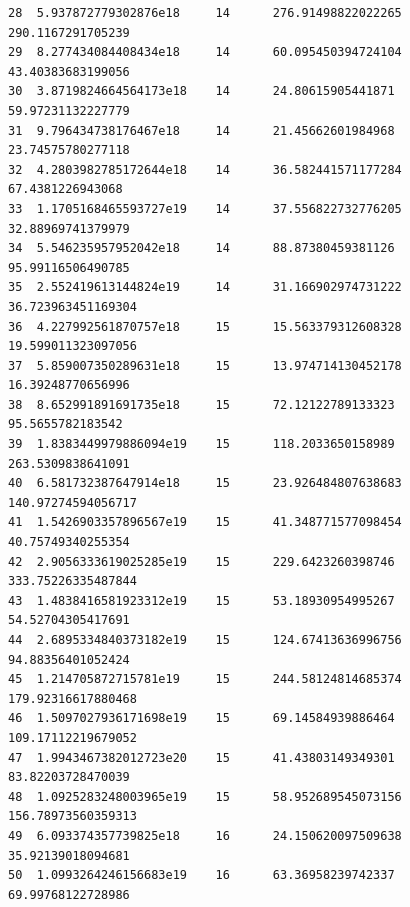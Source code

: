 \documentclass{article}
\begin{document}
\begin{verbatim}
28  5.937872779302876e18     14      276.91498822022265       290.1167291705239
29  8.277434084408434e18     14      60.095450394724104       43.40383683199056
30  3.8719824664564173e18    14      24.80615905441871        59.97231132227779
31  9.796434738176467e18     14      21.45662601984968        23.74575780277118
32  4.2803982785172644e18    14      36.582441571177284       67.4381226943068
33  1.1705168465593727e19    14      37.556822732776205       32.88969741379979
34  5.546235957952042e18     14      88.87380459381126        95.99116506490785
35  2.552419613144824e19     14      31.166902974731222       36.723963451169304
36  4.227992561870757e18     15      15.563379312608328       19.599011323097056
37  5.859007350289631e18     15      13.974714130452178       16.39248770656996
38  8.652991891691735e18     15      72.12122789133323        95.5655782183542
39  1.8383449979886094e19    15      118.2033650158989        263.5309838641091
40  6.581732387647914e18     15      23.926484807638683       140.97274594056717
41  1.5426903357896567e19    15      41.348771577098454       40.75749340255354
42  2.9056333619025285e19    15      229.6423260398746        333.75226335487844
43  1.4838416581923312e19    15      53.18930954995267        54.52704305417691
44  2.6895334840373182e19    15      124.67413636996756       94.88356401052424
45  1.214705872715781e19     15      244.58124814685374       179.92316617880468
46  1.5097027936171698e19    15      69.14584939886464        109.17112219679052
47  1.9943467382012723e20    15      41.43803149349301        83.82203728470039
48  1.0925283248003965e19    15      58.952689545073156       156.78973560359313
49  6.093374357739825e18     16      24.150620097509638       35.92139018094681
50  1.0993264246156683e19    16      63.36958239742337        69.99768122728986
\end{verbatim}
\end{document}
